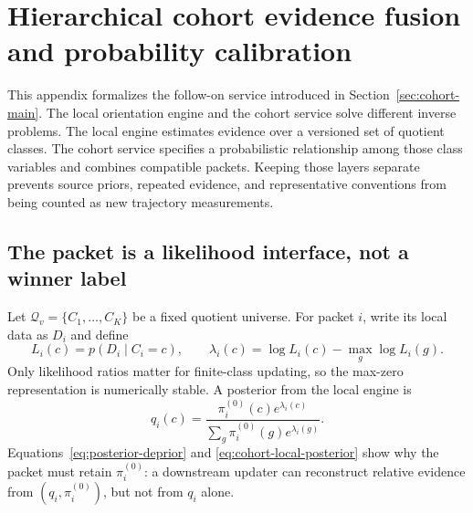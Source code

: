 \documentclass[11pt]{article}
\begin{document}
    \section{Hierarchical cohort evidence fusion and probability calibration}
    \label{app:cohort}

    This appendix formalizes the follow-on service introduced in
    Section~\ref{sec:cohort-main}. The local orientation engine and the cohort service solve
    different inverse problems. The local engine estimates evidence over a versioned set of
    quotient classes. The cohort service specifies a probabilistic relationship among those
    class variables and combines compatible packets. Keeping those layers separate prevents
    source priors, repeated evidence, and representative conventions from being counted as
    new trajectory measurements.

    \subsection{The packet is a likelihood interface, not a winner label}

    Let $\mathcal Q_v=\{C_1,\ldots,C_K\}$ be a fixed quotient universe. For packet $i$,
    write its local data as $D_i$ and define
    \begin{equation}
        L_i(c)=p(D_i\mid C_i=c),
        \qquad
        \lambda_i(c)=\log L_i(c)-\max_g\log L_i(g).
        \label{eq:cohort-local-likelihood}
    \end{equation}
    Only likelihood ratios matter for finite-class updating, so the max-zero representation is
    numerically stable. A posterior from the local engine is
    \begin{equation}
        q_i(c)
        =\frac{\pi_i^{(0)}(c)e^{\lambda_i(c)}}
        {\sum_g\pi_i^{(0)}(g)e^{\lambda_i(g)}}.
        \label{eq:cohort-local-posterior}
    \end{equation}
    Equations~\eqref{eq:posterior-deprior} and \eqref{eq:cohort-local-posterior} show why the
    packet must retain $\pi_i^{(0)}$: a downstream updater can reconstruct relative evidence
    from $(q_i,\pi_i^{(0)})$, but not from $q_i$ alone.
\end{document}
